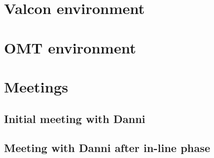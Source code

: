\chapter{Valcon environment}

\chapter{OMT environment}

\chapter{Meetings}
\section{Initial meeting with Danni}

\section{Meeting with Danni after in-line phase}

